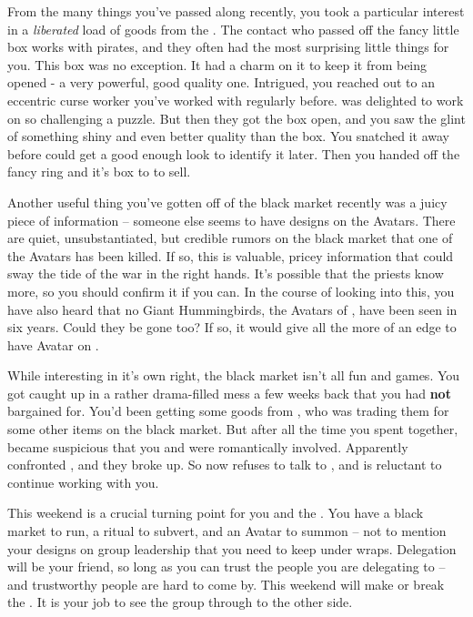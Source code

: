 \documentclass[char]{GL2020}
\begin{document}
From the many things you’ve passed along recently, you took a particular interest in a \emph{liberated} load of goods from the \pFarm{}. The contact who passed off the fancy little box works with pirates, and they often had the most surprising little things for you. This box was no exception. It had a charm on it to keep it from being opened - a very powerful, good quality one. Intrigued, you reached out to an eccentric curse worker you’ve worked with regularly before. \cCurse{} was delighted to work on so challenging a puzzle. But then they got the box open, and you saw the glint of something shiny and even better quality than the box. You snatched it away before \cCurse{} could get a good enough look to identify it later. Then you handed off the fancy ring and it’s box to \cChupInventor{} to sell.

Another useful thing you’ve gotten off of the black market recently was a juicy piece of information -- someone else seems to have designs on the Avatars. There are quiet, unsubstantiated, but credible rumors on the black market that one of the \pShip{} Avatars has been killed. If so, this is valuable, pricey information that could sway the tide of the war in the right hands. It’s possible that the priests know more, so you should confirm it if you can. In the course of looking into this, you have also heard that no Giant Hummingbirds, the Avatars of \cFarmGod{}, have been seen in six years. Could they be gone too? If so, it would give \cGenesis{} all the more of an edge to have \cGenesis{\their} Avatar on \pEarth{}.

While interesting in it's own right, the black market isn’t all fun and games. You got caught up in a rather drama-filled mess a few weeks back that you had \textbf{not} bargained for. You’d been getting some goods from \cEthics{}, who was trading them for some other items on the black market. But after all the time you spent together, \cLibrarian{} became suspicious that you and \cEthics{} were romantically involved. Apparently \cLibrarian{} confronted \cEthics{}, and they broke up. So now \cLibrarian{} refuses to talk to \cEthics{}, and \cEthics{} is reluctant to continue working with you.

This weekend is a crucial turning point for you and the \pGoaties{}. You have a black market to run, a ritual to subvert, and an Avatar to summon -- not to mention your designs on group leadership that you need to keep under wraps. Delegation will be your friend, so long as you can trust the people you are delegating to -- and trustworthy people are hard to come by. This weekend will make or break the \pGoaties{}. It is your job to see the group through to the other side.
\end{document}
